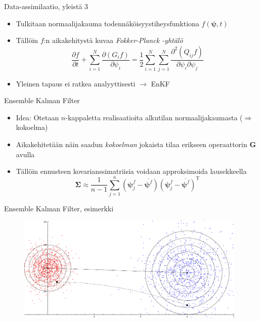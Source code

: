 \documentclass{beamer}
\begin{document}
\begin{frame}{Data-assimilaatio, yleistä 3}

\begin{itemize}
\item Tulkitaan normaalijakauma todennäköisyystiheysfunktiona $f(\boldsymbol{\psi},t)$
\item Tällöin $f$:n aikakehitystä kuvaa \emph{Fokker-Planck -yhtälö}
\[
\frac{\partial f}{\partial t} + \sum_{i=1}^N \frac{\partial \left ( G_i f \right )}{\partial \psi_i} = \frac{1}{2} \sum_{i=1}^N \sum_{j=1}^N \frac{\partial^2 \left ( Q_{ij} f \right )}{\partial \psi_i \partial \psi_j}
\]
\item Yleinen tapaus ei ratkea analyyttisesti $\rightarrow$ EnKF
\end{itemize}

\end{frame}

\begin{frame}{Ensemble Kalman Filter}

\begin{itemize}
\item Idea: Otetaan $n$-kappaletta realisaatioita alkutilan normaalijakaumasta ($\Rightarrow$ kokoelma)
\item Aikakehitetään näin saadun \emph{kokoelman} jokaista tilaa erikseen operaattorin $\boldsymbol{G}$ avulla
\item Tällöin ennusteen kovarianssimatriisia voidaan approksimoida lausekkeella
\[
\boldsymbol{\Sigma} \approx \frac{1}{n-1} \sum_{j=1}^n \left( \boldsymbol{\psi}^f_j - \overline{\boldsymbol{\psi}^f} \right) \left(\boldsymbol{\psi}^f_j - \overline{\boldsymbol{\psi}^f}  \right)^\mathrm{T}
\]
\end{itemize}

\end{frame}

\begin{frame}{Ensemble Kalman Filter, esimerkki}

\begin{figure}
\includegraphics[width=11cm]{enkf3.pdf}
\end{figure}

\end{frame}
\end{document}
